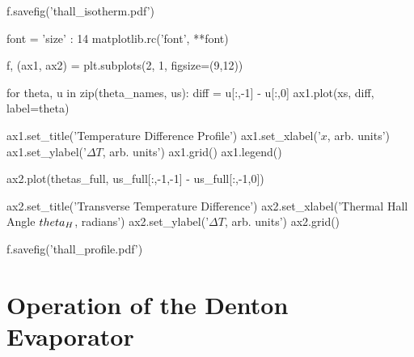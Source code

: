 \documentclass{thesis-umich}
\begin{document}
\begin{singlespace}
\begin{code}
f.savefig('thall_isotherm.pdf')

font = {'size'   : 14}
matplotlib.rc('font', **font)

f, (ax1, ax2) = plt.subplots(2, 1, figsize=(9,12))

for theta, u in zip(theta_names, us):
    diff = u[:,-1] - u[:,0]
    ax1.plot(xs, diff, label=theta)

ax1.set_title('Temperature Difference Profile')
ax1.set_xlabel('$x$, arb. units')
ax1.set_ylabel('$\Delta T$, arb. units')
ax1.grid()
ax1.legend()

ax2.plot(thetas_full, us_full[:,-1,-1] - us_full[:,-1,0])

ax2.set_title('Transverse Temperature Difference')
ax2.set_xlabel('Thermal Hall Angle $\\theta_H$, radians')
ax2.set_ylabel('$\Delta T$, arb. units')
ax2.grid()

f.savefig('thall_profile.pdf')

\end{code}
\end{singlespace}

\chapter{Operation of the Denton Evaporator}
\end{document}
